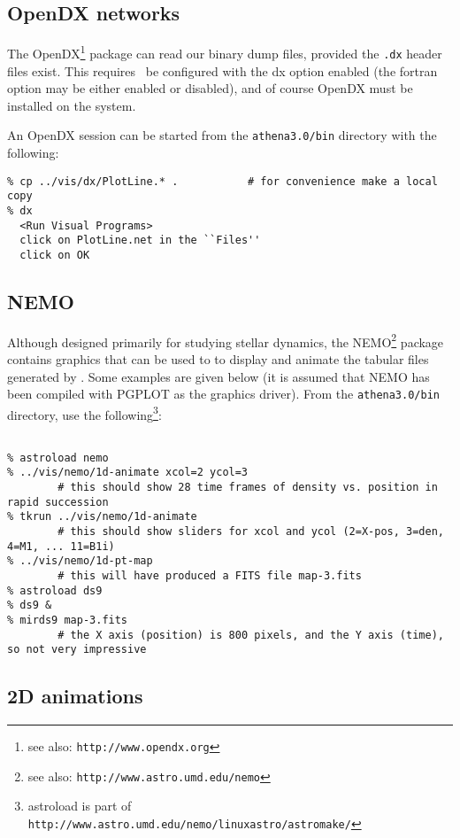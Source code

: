 \subsection{OpenDX networks}

The OpenDX\footnote{see also: {\tt http://www.opendx.org}} package
can read our binary dump files, provided the {\tt .dx} header files exist.
This requires \ath\ be configured with
the dx option enabled (the fortran option may be either enabled or disabled),
and of course OpenDX must be installed on the system.

An OpenDX session can be started from the {\tt athena3.0/bin} directory
with the following:
\footnotesize
\begin{verbatim}
% cp ../vis/dx/PlotLine.* .           # for convenience make a local copy
% dx
  <Run Visual Programs>
  click on PlotLine.net in the ``Files''
  click on OK
\end{verbatim}
\normalsize

\subsection{NEMO}

Although designed primarily for studying stellar dynamics, the 
NEMO\footnote{see also: {\tt http://www.astro.umd.edu/nemo}} package
contains graphics that can be used to 
to display and animate the tabular files generated by \ath.
Some examples are given
below (it is assumed that
NEMO has been compiled with PGPLOT as the graphics driver).
From the {\tt athena3.0/bin} directory, use the 
following\footnote{astroload is part of {\tt http://www.astro.umd.edu/nemo/linuxastro/astromake/}}:

\footnotesize
\begin{verbatim}

% astroload nemo
% ../vis/nemo/1d-animate xcol=2 ycol=3           
        # this should show 28 time frames of density vs. position in rapid succession
% tkrun ../vis/nemo/1d-animate
        # this should show sliders for xcol and ycol (2=X-pos, 3=den, 4=M1, ... 11=B1i)
% ../vis/nemo/1d-pt-map
        # this will have produced a FITS file map-3.fits
% astroload ds9
% ds9 &
% mirds9 map-3.fits
        # the X axis (position) is 800 pixels, and the Y axis (time), so not very impressive

\end{verbatim}
\normalsize

\subsection{2D animations}


